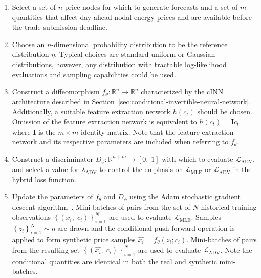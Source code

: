 \begin{enumerate}
    \item Select a set of $n$ price nodes for which to generate forecasts and a set of $m$ quantities
    that affect day-ahead nodal energy prices and are available before the trade submission deadline.

    \item Choose an $n$-dimensional probability distribution to be the reference distribution $\eta$.
    Typical choices are standard uniform or Gaussian distributions, however, any distribution with tractable
    log-likelihood evaluations and sampling capabilities could be used.

    \item Construct a diffeomorphism $f_\theta : \mathbb{R}^n \mapsto \mathbb{R}^n$ characterized by the cINN architecture
    described in Section~\ref{sec:conditional-invertible-neural-network}.
    Additionally, a suitable feature extraction network $h(c_t)$ should be chosen.
    Omission of the feature extraction network is equivalent to $h(c_t) = \mathbf{I}c_t$ where $\mathbf{I}$
    is the $m \times m$ identity matrix.
    Note that the feature extraction network and its respective parameters are included when referring to $f_\theta$.

    \item Construct a discriminator $D_\phi : \mathbb{R}^{n + m} \mapsto [0,\;1]$ with which to evaluate $\mathcal{L}_{\text{ADV}}$,
    and select a value for $\lambda_{\text{ADV}}$ to control the emphasis on $\mathcal{L}_{\text{MLE}}$ or
    $\mathcal{L}_{\text{ADV}}$ in the hybrid loss function.

    \item Update the parameters of $f_\theta$ and $D_\phi$ using the Adam stochastic gradient descent algorithm~\cite{adam_optim}.
    Mini-batches of pairs from the set of $N$ historical training observations
    $\left\{ \left( x_i,\; c_i \right) \right\}_{i=1}^N$ are used to evaluate $\mathcal{L}_{\text{MLE}}$.
    Samples $\left\{ z_i \right\}_{i=1}^N \sim \eta$ are drawn and the conditional push forward operation is applied
    to form synthetic price samples $\hat{x_i} = f_\theta(z_i; c_i)$.
    Mini-batches of pairs from the resulting set $\left\{ \left(\hat{x_i},\; c_i \right) \right\}_{i=1}^N$ are used to
    evaluate $\mathcal{L}_{\text{ADV}}$.
    Note the conditional quantities are identical in both the real and synthetic mini-batches.
\end{enumerate}

